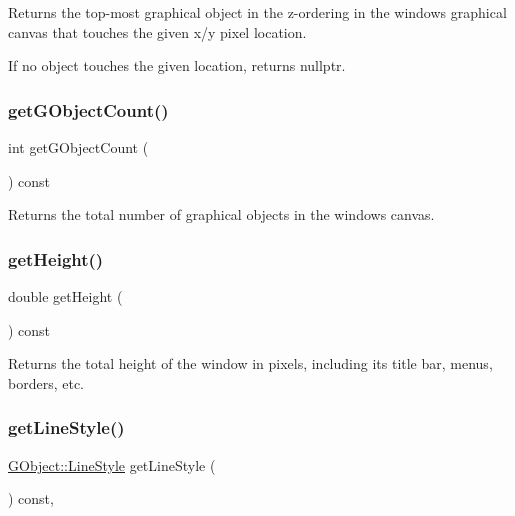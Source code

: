 Returns the top-\/most graphical object in the z-\/ordering in the window\textquotesingle{}s graphical canvas that touches the given x/y pixel location. 

If no object touches the given location, returns nullptr. \mbox{\label{classGWindow_ad59694124f2cdd71af9c137094df4d1f}} 
\subsubsection{\texorpdfstring{get\+G\+Object\+Count()}{getGObjectCount()}}
{\footnotesize\ttfamily int get\+G\+Object\+Count (\begin{DoxyParamCaption}{ }\end{DoxyParamCaption}) const\hspace{0.3cm}{\ttfamily [virtual]}}



Returns the total number of graphical objects in the window\textquotesingle{}s canvas. 

\mbox{\label{classGWindow_a1e7e353362434072875264cf95629f99}} 
\subsubsection{\texorpdfstring{get\+Height()}{getHeight()}}
{\footnotesize\ttfamily double get\+Height (\begin{DoxyParamCaption}{ }\end{DoxyParamCaption}) const\hspace{0.3cm}{\ttfamily [virtual]}}



Returns the total height of the window in pixels, including its title bar, menus, borders, etc. 

\mbox{\label{classGDrawingSurface_aaf1f5ea8281e5e3486662878d26f0a13}} 
\subsubsection{\texorpdfstring{get\+Line\+Style()}{getLineStyle()}}
{\footnotesize\ttfamily \mbox{\hyperlink{classGObject_a86e0f5648542856159bb40775c854aa7}{G\+Object\+::\+Line\+Style}} get\+Line\+Style (\begin{DoxyParamCaption}{ }\end{DoxyParamCaption}) const\hspace{0.3cm}{\ttfamily [virtual]}, {\ttfamily [inherited]}}



